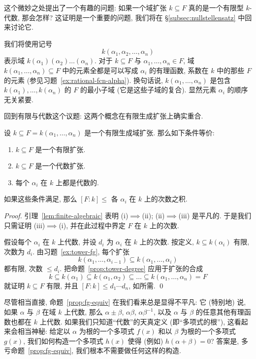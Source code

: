 这个微妙之处提出了一个有趣的问题: 如果一个域扩张 $k\subseteq F$ 真的是一个有限型 $k$-代数, 那会怎样? 这证明是一个重要的问题, 我们将在 §\ref{subsec:nullstellensatz} 中回来讨论它.

我们将使用记号
\[
k(\alpha_1,\alpha_2,\dots,\alpha_n)
\]
表示域 $k(\alpha_1)(\alpha_2)\ldots(\alpha_n)$. 对于 $k\subseteq F$ 与 $\alpha_1,\ldots,\alpha_n\in F$, 域 $k(\alpha_1,\ldots,\alpha_n)\subseteq F$ 中的元素全都是可以写成 $\alpha_i$ 的有理函数, 系数在 $k$ 中的那些 $F$ 的元素 (参见习题~\ref{ex:rational-fcn-alpha}). 换句话说, $k(\alpha_1,\ldots,\alpha_n)$ 是包含 $k(\alpha_1),\ldots,k(\alpha_n)$ 的 $F$ 的最小子域 (它是这些子域的复合). 显然元素 $\alpha_i$ 的顺序无关紧要.

回到有限与代数这个议题: 这两个概念在有限生成扩张上确实重合.

\begin{proposition}\label{prop:fg-equiv}
设 $k\subseteq F=k(\alpha_1,\ldots,\alpha_n)$ 是一个有限生成域扩张. 那么如下条件等价:

\begin{enumerate}[label=(\roman*)]
\item $k\subseteq F$ 是一个有限扩张.
\item $k\subseteq F$ 是一个代数扩张.
\item 每个 $\alpha_i$ 在 $k$ 上都是代数的.
\end{enumerate}
如果这些条件满足, 那么 $[F:k]\leq$ 各 $\alpha_i$ 在 $k$ 上的次数之积.
\end{proposition}

\begin{proof}
引理~\ref{lem:finite-algebraic} 表明 (i)$\implies$(ii); (ii)$\implies$(iii) 是平凡的. 于是我们只需证明 (iii)$\implies$(i), 并在此过程中界定 $F$ 在 $k$ 上的次数.

假设每个 $\alpha_i$ 在 $k$ 上代数, 并设 $d_i$ 为 $\alpha_i$ 在 $k$ 上的次数. 按定义, $k\subseteq k(\alpha_i)$ 有限, 次数为 $d_i$. 由习题~\ref{ex:tower-fg}, 每个扩张
\[
k(\alpha_1,\dots,\alpha_{i-1})\subseteq k(\alpha_1,\dots,\alpha_i)
\]
都有限, 次数 $\leq d_i$. 把命题~\ref{prop:tower-degree} 应用于扩张的合成
\[
k\subseteq k(\alpha_1)\subseteq k(\alpha_1,\alpha_2)\subseteq\dots\subseteq k(\alpha_1,\dots,\alpha_n)=F
\]
就证明 $k\subseteq F$ 有限, 并且 $[F:k]\leq d_1\cdots d_n$, 如所需. \qed
\end{proof}

尽管相当直接, 命题~\ref{prop:fg-equiv} 在我们看来总是显得不平凡: 它 (特别地) 说, 如果 $\alpha$ 与 $\beta$ 在域 $k$ 上代数, 那么 $\alpha\pm\beta$, $\alpha\beta$, $\alpha\beta^{-1}$, 以及 $\alpha$ 与 $\beta$ 的任意其他有理函数也都在 $k$ 上代数. 如果我们只知道``代数''的天真定义 (即``多项式的根''), 这看起来会相当神秘: 给定以 $\alpha$ 为根的一个多项式 $f(x)$ 和以 $\beta$ 为根的一个多项式 $g(x)$, 我们如何构造一个多项式 $h(x)$ 使得 (例如) $h(\alpha+\beta)=0$? 答案是, 多亏命题~\ref{prop:fg-equiv}, 我们根本不需要做任何这样的构造.

